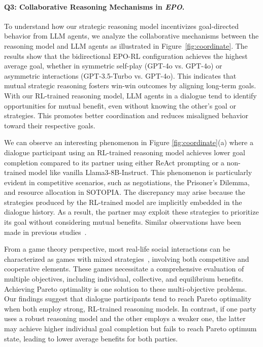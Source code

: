 \paragraph{\textbf{Q3: Collaborative Reasoning Mechanisms in \textit{EPO}.}}
To understand how our strategic reasoning model incentivizes goal-directed behavior from LLM agents, we analyze the collaborative mechanisms between the reasoning model and LLM agents as illustrated in Figure~\ref{fig:coordinate}.
The results show that the bidirectional EPO-RL configuration achieves the highest average goal, whether in symmetric self-play (GPT-4o vs. GPT-4o) or asymmetric interactions (GPT-3.5-Turbo vs. GPT-4o). This indicates that mutual strategic reasoning fosters win-win outcomes by aligning long-term goals.
With our RL-trained reasoning model, LLM agents in a dialogue tend to identify opportunities for mutual benefit, even without knowing the other’s goal or strategies. This promotes better coordination and reduces misaligned behavior toward their respective goals. 

We can observe an interesting phenomenon in Figure \ref{fig:coordinate}(a) where a dialogue participant using an RL-trained reasoning model achieves lower goal completion compared to its partner using either ReAct prompting or a non-trained model like vanilla Llama3-8B-Instruct. This phenomenon is particularly evident in competitive scenarios, such as negotiations, the Prisoner's Dilemma, and resource allocation in SOTOPIA. The discrepancy may arise because the strategies produced by the RL-trained model are implicitly embedded in the dialogue history. As a result, the partner may exploit these strategies to prioritize its goal without considering mutual benefits. Similar observations have been made in previous studies~\cite{Hua2024GametheoreticLA}.

From a game theory perspective, most real-life social interactions can be characterized as games with mixed strategies~\cite{75b5cec4-4f40-3f36-9492-860b8376add8}, involving both competitive and cooperative elements. These games necessitate a comprehensive evaluation of multiple objectives, including individual, collective, and equilibrium benefits. Achieving Pareto optimality is one solution to these multi-objective problems.
Our findings suggest that dialogue participants tend to reach Pareto optimality when both employ strong, RL-trained reasoning models. In contrast, if one party uses a robust reasoning model and the other employs a weaker one, the latter may achieve higher individual goal completion but fails to reach Pareto optimum state, leading to lower average benefits for both parties.


